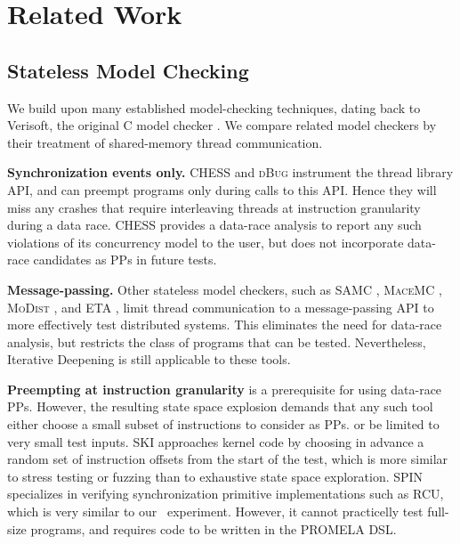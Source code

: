 \section{Related Work}


\subsection{Stateless Model Checking}

We build upon many established model-checking techniques, dating back
to Verisoft, the original C model checker \cite{verisoft}.
We compare related model checkers by their treatment of shared-memory thread communication.

{\bf Synchronization events only.} CHESS \cite{chess} and \textsc{dBug} \cite{dbug-ssv} instrument the thread library API, and can preempt programs only during calls to this API.
Hence they will miss any crashes that require interleaving threads at instruction granularity during a data race. CHESS provides a data-race analysis to report any such violations of its concurrency model to the user, but does not incorporate data-race candidates as PPs in future tests.

{\bf Message-passing.} Other stateless model checkers, such as SAMC \cite{samc}, \textsc{MaceMC} \cite{macemc}, \textsc{MoDist} \cite{modist}, and ETA \cite{dbug-retreat}, limit thread communication to a message-passing API to more effectively test distributed systems.
This eliminates the need for data-race analysis, but restricts the class of programs that can be tested.
Nevertheless, Iterative Deepening is still applicable to these tools.

{\bf Preempting at instruction granularity} is a prerequisite for using data-race PPs.
However, the resulting state space explosion demands that any such tool either
choose a small subset of instructions to consider as PPs.
or be limited to very small test inputs.
{\textsc SKI} \cite{ski} approaches kernel code by choosing in advance a random set of instruction offsets from the start of the test,
which is more similar to stress testing or fuzzing than to exhaustive state space exploration.
SPIN \cite{spin} specializes in verifying synchronization primitive implementations such as RCU, which is very similar to our \mxtest~experiment.
However, it cannot practicelly test full-size programs, and requires code to be written in the PROMELA DSL.

